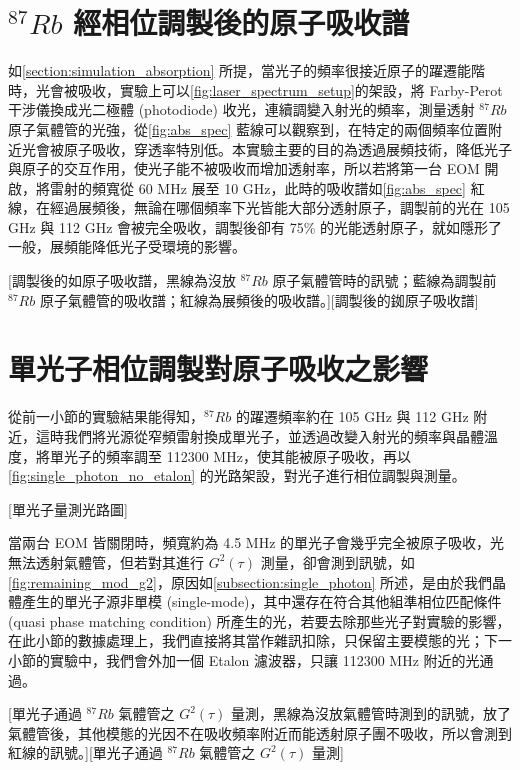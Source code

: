 \documentclass[class=NCU_thesis, crop=false]{standalone}
\begin{document}
\section{$^{87}Rb$ 經相位調製後的原子吸收譜}

如\cref{section:simulation_absorption} 所提，當光子的頻率很接近原子的躍遷能階時，光會被吸收，實驗上可以\cref{fig:laser_spectrum_setup}的架設，將 Farby-Perot 干涉儀換成光二極體 (photodiode) 收光，連續調變入射光的頻率，測量透射 $^{87}Rb$ 原子氣體管的光強，從\cref{fig:abs_spec} 藍線可以觀察到，在特定的兩個頻率位置附近光會被原子吸收，穿透率特別低。本實驗主要的目的為透過展頻技術，降低光子與原子的交互作用，使光子能不被吸收而增加透射率，所以若將第一台 EOM 開啟，將雷射的頻寬從 60 MHz 展至 10 GHz，此時的吸收譜如\cref{fig:abs_spec} 紅線，在經過展頻後，無論在哪個頻率下光皆能大部分透射原子，調製前的光在 105 GHz 與 112 GHz 會被完全吸收，調製後卻有 75\% 的光能透射原子，就如隱形了一般，展頻能降低光子受環境的影響。

[調製後的如原子吸收譜，黑線為沒放 $^{87}Rb$ 原子氣體管時的訊號；藍線為調製前 $^{87}Rb$ 原子氣體管的吸收譜；紅線為展頻後的吸收譜。][調製後的銣原子吸收譜]

\section{單光子相位調製對原子吸收之影響}
從前一小節的實驗結果能得知，$^{87}Rb$ 的躍遷頻率約在 105 GHz 與 112 GHz 附近，這時我們將光源從窄頻雷射換成單光子，並透過改變入射光的頻率與晶體溫度，將單光子的頻率調至 112300 MHz，使其能被原子吸收，再以\cref{fig:single_photon_no_etalon} 的光路架設，對光子進行相位調製與測量。

[單光子量測光路圖]

當兩台 EOM 皆關閉時，頻寬約為 4.5 MHz 的單光子會幾乎完全被原子吸收，光無法透射氣體管，但若對其進行 $G^{2}(\tau)$ 測量，卻會測到訊號，如\cref{fig:remaining_mod_g2}，原因如\cref{subsection:single_photon} 所述，是由於我們晶體產生的單光子源非單模 (single-mode)，其中還存在符合其他組準相位匹配條件 (quasi phase matching condition) 所產生的光，若要去除那些光子對實驗的影響，在此小節的數據處理上，我們直接將其當作雜訊扣除，只保留主要模態的光；下一小節的實驗中，我們會外加一個 Etalon 濾波器，只讓 112300 MHz 附近的光通過。

[單光子通過 $^{87}Rb$ 氣體管之 $G^{2}(\tau)$ 量測，黑線為沒放氣體管時測到的訊號，放了氣體管後，其他模態的光因不在吸收頻率附近而能透射原子團不吸收，所以會測到紅線的訊號。][單光子通過 $^{87}Rb$ 氣體管之 $G^{2}(\tau)$ 量測]
\end{document}
